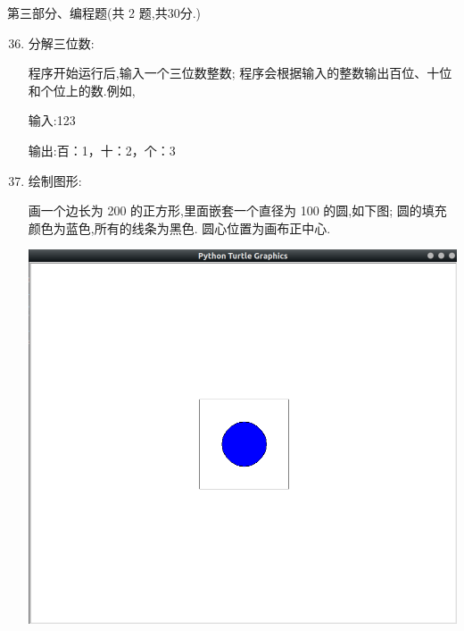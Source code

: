 \documentclass[11pt]{ctexart}
\begin{document}
    {\noindent\heiti 第三部分、编程题(共 2 题,共30分.)}
    \begin{enumerate}
        \setcounter{enumi}{35}
        
        \item 分解三位数:
        \begin{tasks}[label = (\arabic*)]
            \task 程序开始运行后,输入一个三位数整数;
            \task 程序会根据输入的整数输出百位、十位和个位上的数.例如,

            {\heiti 输入:}123

            {\heiti 输出:}百：1，十：2，个：3
        \end{tasks}
        \vfill

        \item 绘制图形:
        
        \begin{tasks}[label = (\arabic*)]
            \task 画一个边长为 200 的正方形,里面嵌套一个直径为 100 的圆,如下图;
            \task 圆的填充颜色为蓝色,所有的线条为黑色.
            \task 圆心位置为画布正中心.
        \end{tasks}
        \begin{center}
            \includegraphics[width=.4\textwidth]{37.png}
        \end{center}
        \vfill
    \end{enumerate}
\end{document}
